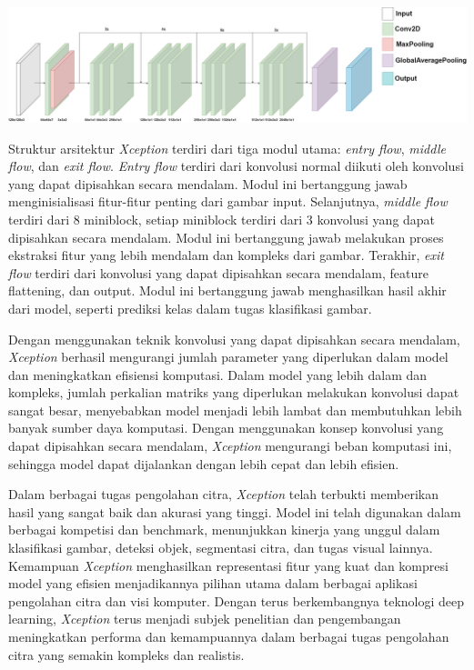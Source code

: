 \begin{center}
  \includegraphics[width=0.8\linewidth]{gambar/bener/Arsitektur_CNNXception.png}
  \label{fig:Arsitektur Xception}
\end{center}
Struktur arsitektur \textit{Xception} terdiri dari tiga modul utama: \textit{entry flow}, \textit{middle flow}, dan \textit{exit flow}. \textit{Entry flow} terdiri dari konvolusi normal diikuti oleh konvolusi yang dapat dipisahkan secara mendalam. Modul ini bertanggung jawab menginisialisasi fitur-fitur penting dari gambar input. Selanjutnya, \textit{middle flow} terdiri dari 8 miniblock, setiap miniblock terdiri dari 3 konvolusi yang dapat dipisahkan secara mendalam. Modul ini bertanggung jawab melakukan proses ekstraksi fitur yang lebih mendalam dan kompleks dari gambar. Terakhir, \textit{exit flow} terdiri dari konvolusi yang dapat dipisahkan secara mendalam, feature flattening, dan output. Modul ini bertanggung jawab menghasilkan hasil akhir dari model, seperti prediksi kelas dalam tugas klasifikasi gambar.

Dengan menggunakan teknik konvolusi yang dapat dipisahkan secara mendalam, \textit{Xception} berhasil mengurangi jumlah parameter yang diperlukan dalam model dan meningkatkan efisiensi komputasi. Dalam model yang lebih dalam dan kompleks, jumlah perkalian matriks yang diperlukan melakukan konvolusi dapat sangat besar, menyebabkan model menjadi lebih lambat dan membutuhkan lebih banyak sumber daya komputasi. Dengan menggunakan konsep konvolusi yang dapat dipisahkan secara mendalam, \textit{Xception} mengurangi beban komputasi ini, sehingga model dapat dijalankan dengan lebih cepat dan lebih efisien.

Dalam berbagai tugas pengolahan citra, \textit{Xception} telah terbukti memberikan hasil yang sangat baik dan akurasi yang tinggi. Model ini telah digunakan dalam berbagai kompetisi dan benchmark, menunjukkan kinerja yang unggul dalam klasifikasi gambar, deteksi objek, segmentasi citra, dan tugas visual lainnya. Kemampuan \textit{Xception} menghasilkan representasi fitur yang kuat dan kompresi model yang efisien menjadikannya pilihan utama dalam berbagai aplikasi pengolahan citra dan visi komputer. Dengan terus berkembangnya teknologi deep learning, \textit{Xception} terus menjadi subjek penelitian dan pengembangan meningkatkan performa dan kemampuannya dalam berbagai tugas pengolahan citra yang semakin kompleks dan realistis.



